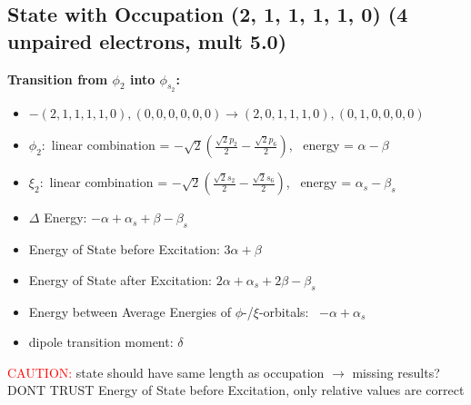 \documentclass[12pt,a4paper]{article}
\begin{document}
\subsection*{State with Occupation (2, 1, 1, 1, 1, 0) (4 unpaired electrons, mult 5.0)}
        \noindent\textbf{Transition from $\phi_{2}$ into $\phi_{s_{2}}$:}
        \begin{itemize}
            \item $- (2, 1, 1, 1, 1, 0), (0, 0, 0, 0, 0, 0) \rightarrow (2, 0, 1, 1, 1, 0), (0, 1, 0, 0, 0, 0)$
        
            \item $\phi_{2}:$ linear combination = $- \sqrt{2} \left(\frac{\sqrt{2} p_{2}}{2} - \frac{\sqrt{2} p_{6}}{2}\right)$, \
            energy = $\alpha - \beta$
            
            \item $\xi_{2}:$ linear combination = $- \sqrt{2} \left(\frac{\sqrt{2} s_{2}}{2} - \frac{\sqrt{2} s_{6}}{2}\right)$, \
            energy = $\alpha_{s} - \beta_{s}$
            
            \item $\Delta$ Energy: $- \alpha + \alpha_{s} + \beta - \beta_{s}$
            \item Energy of State before Excitation: $3 \alpha + \beta$
            \item Energy of State after Excitation: $2 \alpha + \alpha_{s} + 2 \beta - \beta_{s}$
            \item Energy between Average Energies of $\phi$-/$\xi$-orbitals: \
            $- \alpha + \alpha_{s}$
        
            \item dipole transition moment: $\delta$
        
        \end{itemize}
        
	\textcolor{red}{CAUTION:} state should have same length as occupation $\rightarrow$ missing results?
	DONT TRUST \glqq{}Energy of State before Excitation\grqq{}, only relative values are correct
\end{document}
